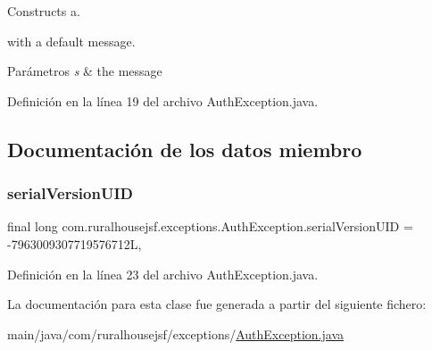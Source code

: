 Constructs a. 


\begin{DoxyCode}{0}
\end{DoxyCode}
 with a default message. 
\begin{DoxyParams}{Parámetros}
{\em s} & the message \\
\hline
\end{DoxyParams}


Definición en la línea 19 del archivo Auth\+Exception.\+java.



\subsection{Documentación de los datos miembro}
\mbox{\label{a00204_a0bda3b553296d4340933a563b323bb5f}} 
\subsubsection{\texorpdfstring{serialVersionUID}{serialVersionUID}}
{\footnotesize\ttfamily final long com.\+ruralhousejsf.\+exceptions.\+Auth\+Exception.\+serial\+Version\+U\+ID = -\/7963009307719576712L\hspace{0.3cm}{\ttfamily [static]}, {\ttfamily [private]}}



Definición en la línea 23 del archivo Auth\+Exception.\+java.



La documentación para esta clase fue generada a partir del siguiente fichero\+:\begin{DoxyCompactItemize}
\item 
main/java/com/ruralhousejsf/exceptions/\mbox{\hyperlink{a00059}{Auth\+Exception.\+java}}\end{DoxyCompactItemize}
